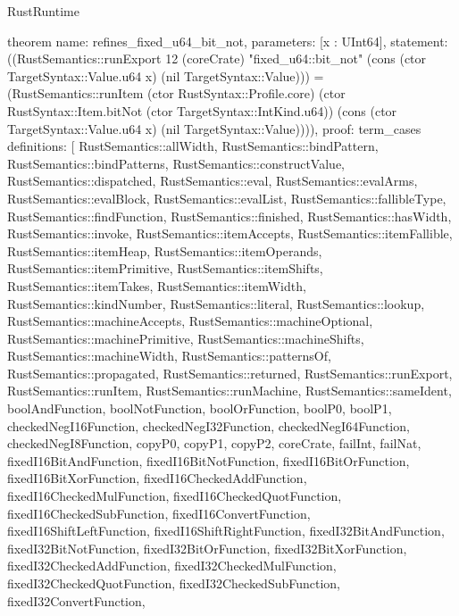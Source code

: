 \begin{lexlean}{RustRuntime}
\begin{semanticmodule}
theorem{
  name: refines_fixed_u64_bit_not,
  parameters: [x : UInt64],
  statement: ((RustSemantics::runExport 12 (coreCrate) "fixed_u64::bit_not" (cons (ctor TargetSyntax::Value.u64 x) (nil TargetSyntax::Value))) = (RustSemantics::runItem (ctor RustSyntax::Profile.core) (ctor RustSyntax::Item.bitNot (ctor TargetSyntax::IntKind.u64)) (cons (ctor TargetSyntax::Value.u64 x) (nil TargetSyntax::Value)))),
  proof: term_cases{
    definitions: [
      RustSemantics::allWidth,
      RustSemantics::bindPattern,
      RustSemantics::bindPatterns,
      RustSemantics::constructValue,
      RustSemantics::dispatched,
      RustSemantics::eval,
      RustSemantics::evalArms,
      RustSemantics::evalBlock,
      RustSemantics::evalList,
      RustSemantics::fallibleType,
      RustSemantics::findFunction,
      RustSemantics::finished,
      RustSemantics::hasWidth,
      RustSemantics::invoke,
      RustSemantics::itemAccepts,
      RustSemantics::itemFallible,
      RustSemantics::itemHeap,
      RustSemantics::itemOperands,
      RustSemantics::itemPrimitive,
      RustSemantics::itemShifts,
      RustSemantics::itemTakes,
      RustSemantics::itemWidth,
      RustSemantics::kindNumber,
      RustSemantics::literal,
      RustSemantics::lookup,
      RustSemantics::machineAccepts,
      RustSemantics::machineOptional,
      RustSemantics::machinePrimitive,
      RustSemantics::machineShifts,
      RustSemantics::machineWidth,
      RustSemantics::patternsOf,
      RustSemantics::propagated,
      RustSemantics::returned,
      RustSemantics::runExport,
      RustSemantics::runItem,
      RustSemantics::runMachine,
      RustSemantics::sameIdent,
      boolAndFunction,
      boolNotFunction,
      boolOrFunction,
      boolP0,
      boolP1,
      checkedNegI16Function,
      checkedNegI32Function,
      checkedNegI64Function,
      checkedNegI8Function,
      copyP0,
      copyP1,
      copyP2,
      coreCrate,
      failInt,
      failNat,
      fixedI16BitAndFunction,
      fixedI16BitNotFunction,
      fixedI16BitOrFunction,
      fixedI16BitXorFunction,
      fixedI16CheckedAddFunction,
      fixedI16CheckedMulFunction,
      fixedI16CheckedQuotFunction,
      fixedI16CheckedSubFunction,
      fixedI16ConvertFunction,
      fixedI16ShiftLeftFunction,
      fixedI16ShiftRightFunction,
      fixedI32BitAndFunction,
      fixedI32BitNotFunction,
      fixedI32BitOrFunction,
      fixedI32BitXorFunction,
      fixedI32CheckedAddFunction,
      fixedI32CheckedMulFunction,
      fixedI32CheckedQuotFunction,
      fixedI32CheckedSubFunction,
      fixedI32ConvertFunction,
}}
\end{semanticmodule}
\end{lexlean}
